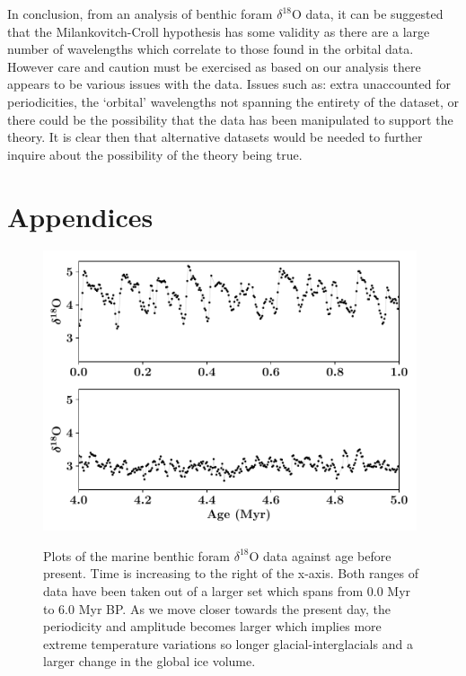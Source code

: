 \documentclass[12pt, onecolumn]{revtex4}    %
\begin{document}
In conclusion, from an analysis of benthic foram $\delta^{18}$O data, it can be suggested that the Milankovitch-Croll hypothesis has some validity as there are a large number of wavelengths which correlate to those found in the orbital data. However care and caution must be exercised as based on our analysis there appears to be various issues with the data. Issues such as: extra unaccounted for periodicities, the `orbital' wavelengths not spanning the entirety of the dataset, or there could be the possibility that the data has been manipulated to support the theory. It is clear then that alternative datasets would be needed to further inquire about the possibility of the theory being true.

\newpage





\newpage

\section*{Appendices}
\begin{figure}[!h]
\begin{center}
\includegraphics[width=11cm]{figures/foram_data}
\caption[]{Plots of the marine benthic foram $\delta^{18}$O data against age before present. Time is increasing to the right of the x-axis. Both ranges of data have been taken out of a larger set which spans from 0.0 Myr to 6.0 Myr BP. As we move closer towards the present day, the periodicity and amplitude becomes larger which implies more extreme temperature variations so longer glacial-interglacials and a larger change in the global ice volume.}
\vspace{-3ex}
\label{fig:foram_data}
\end{center}
\end{figure}
\end{document}
